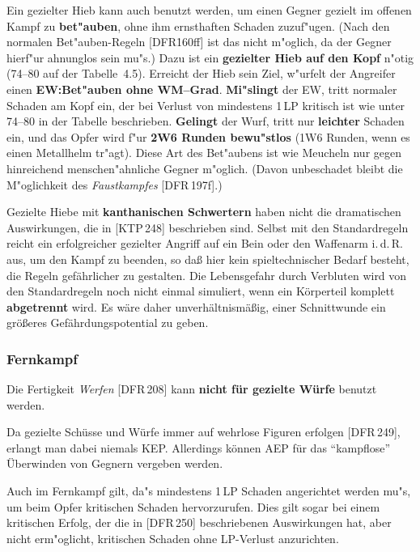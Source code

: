 \documentclass[10pt,a4paper,germanpar]{article}
\begin{document}
Ein gezielter Hieb kann auch benutzt werden, um einen Gegner gezielt
im offenen Kampf zu \textbf{bet"auben}, ohne ihm ernsthaften Schaden
zuzuf"ugen. (Nach den normalen Bet"auben-Regeln [DFR\.160ff] ist das
nicht m"oglich, da der Gegner hierf"ur ahnunglos sein mu"s.) Dazu ist
ein \textbf{gezielter Hieb auf den Kopf} n"otig (74--80 auf der
Tabelle~4.5). Erreicht der Hieb sein Ziel, w"urfelt der Angreifer einen
\textbf{EW:Bet"auben ohne WM--Grad}. \textbf{Mi"slingt} der EW, tritt
normaler Schaden am Kopf ein, der bei Verlust von mindestens 1\,LP
kritisch ist wie unter 74--80 in der Tabelle
beschrieben. \textbf{Gelingt} der Wurf, tritt nur \textbf{leichter}
Schaden ein, und das Opfer wird f"ur \textbf{2W6 Runden bewu"stlos}
(1W6 Runden, wenn es einen Metallhelm tr"agt). Diese Art des
Bet"aubens ist wie Meucheln nur gegen hinreichend menschen"ahnliche
Gegner m"oglich. (Davon unbeschadet bleibt die M"oglichkeit des
\emph{Faustkampfes} [DFR\,197f].)

Gezielte Hiebe mit \textbf{kanthanischen Schwertern} haben nicht die
dramatischen Auswirkungen, die in [KTP\,248] beschrieben sind. Selbst
mit den Standardregeln reicht ein erfolgreicher gezielter Angriff auf
ein Bein oder den Waffenarm i.\,d.\,R. aus, um den Kampf zu beenden,
so daß hier kein spieltechnischer Bedarf besteht, die Regeln
gefährlicher zu gestalten. Die Lebensgefahr durch Verbluten wird von
den Standardregeln noch nicht einmal simuliert, wenn ein Körperteil
komplett \textbf{abgetrennt} wird. Es wäre daher unverhältnismäßig,
einer Schnittwunde ein größeres Gefährdungspotential zu geben.

\subsubsection{Fernkampf}

Die Fertigkeit \emph{Werfen} [DFR\,208] kann \textbf{nicht für gezielte
  Würfe} benutzt werden.

Da gezielte Schüsse und Würfe immer auf wehrlose Figuren erfolgen
[DFR\,249], erlangt man dabei niemals KEP. Allerdings können AEP
für das "`kampflose"' Überwinden von Gegnern vergeben werden.

Auch im Fernkampf gilt, da"s mindestens 1\,LP Schaden angerichtet
werden mu"s, um beim Opfer kritischen Schaden hervorzurufen. Dies gilt
sogar bei einem kritischen Erfolg, der die in [DFR\,250] beschriebenen
Auswirkungen hat, aber nicht erm"oglicht, kritischen Schaden ohne
LP-Verlust anzurichten.
\end{document}
